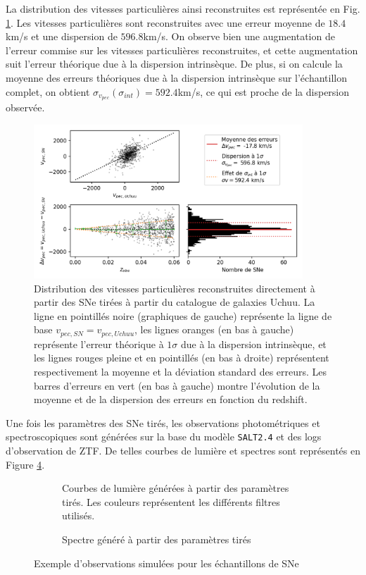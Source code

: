 \documentclass{book}
\def\saltd{\texttt{SALT2.4}\xspace}
\begin{document}
La distribution des vitesses particulières ainsi reconstruites est représentée en Fig. \ref{fig:vp_draw}. Les vitesses particulières sont reconstruites avec une erreur moyenne de $18.4$km/s et une dispersion de $596.8$km/s. On observe bien une augmentation de l'erreur commise sur les vitesses particulières reconstruites, et cette augmentation suit l'erreur théorique due à la dispersion intrinsèque. De plus, si on calcule la moyenne des erreurs théoriques due à la dispersion intrinsèque sur l'échantillon complet, on obtient $\sigma_{v_{pec}}(\sigma_{int}) = 592.4$km/s, ce qui est proche de la dispersion observée.

\begin{figure}
	\centering
	\includegraphics[width=0.9\textwidth]{figures/vp_draw.png}
	\caption{Distribution des vitesses particulières reconstruites directement à partir des SNe tirées à partir du catalogue de galaxies Uchuu. La ligne en pointillés noire (graphiques de gauche) représente la ligne de base $v_{pec, SN} = v_{pec, Uchuu}$, les lignes oranges (en bas à gauche) représente l'erreur théorique à $1\sigma$ due à la dispersion intrinsèque, et les lignes rouges pleine et en pointillés (en bas à droite) représentent respectivement la moyenne et la déviation standard des erreurs. Les barres d'erreurs en vert (en bas à gauche) montre l'évolution de la moyenne et de la dispersion des erreurs en fonction du redshift.}
	\label{fig:vp_draw}
\end{figure}

Une fois les paramètres des SNe tirés, les observations photométriques et spectroscopiques sont générées sur la base du modèle \saltd et des logs d'observation de ZTF. De telles courbes de lumière et spectres sont représentés en Figure \ref{fig:obs}.

\begin{figure}
	\centering
	\begin{subfigure}[c]{0.45\textwidth}
		\caption{Courbes de lumière générées à partir des paramètres tirés. Les couleurs représentent les différents filtres utilisés.}
		\label{fig:lc}
	\end{subfigure}
	\hfill
	\begin{subfigure}[c]{0.5\textwidth}
		\centering
		\caption{Spectre généré à partir des paramètres tirés}
		\label{fig:spectra}
	\end{subfigure}
	\label{fig:obs}
	\caption{Exemple d'observations simulées pour les échantillons de SNe}
\end{figure}
\end{document}
